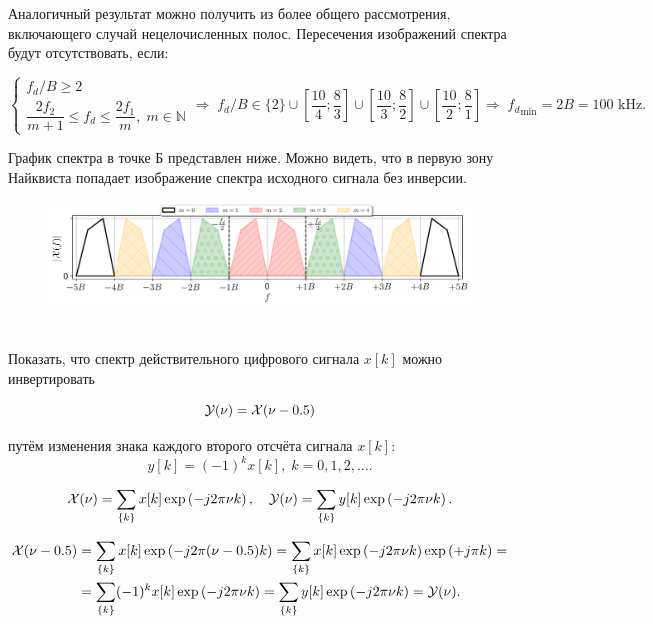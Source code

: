 Аналогичный результат можно получить из более общего рассмотрения, включающего случай нецелочисленных полос. Пересечения изображений спектра будут отсутствовать, если:

\begin{equation*}
\begin{cases}
f_d/B \geq 2\\
\dfrac{2f_2}{m+1} \leq f_d \leq \dfrac{2f_1}{m},\; m \in \mathbb{N}
\end{cases} \Rightarrow \;
f_d/B \in \{2\} 
\cup \left[\dfrac{10}{4}; \dfrac{8}{3}\right] 
\cup \left[\dfrac{10}{3}; \dfrac{8}{2}\right]  
\cup \left[\dfrac{10}{2}; \dfrac{8}{1}\right]  \Rightarrow \;
{f_d}_{\min} = 2B = 100 \text{ kHz.}
\end{equation*}

График спектра в точке Б представлен ниже. Можно видеть, что в первую зону Найквиста попадает изображение спектра исходного сигнала без инверсии.
\begin{figure}[h]
	\centering
	\includegraphics[width=\linewidth]{pics/spring/11/11-2-1.png}
	\label{fig:11-1-2}
\end{figure}

\section{}
Показать, что спектр действительного цифрового сигнала $x[k]$ можно инвертировать

\begin{equation*}
\mathcal{Y}(\nu) = \mathcal{X}(\nu-0.5)
\end{equation*}

путём изменения знака каждого второго отсчёта сигнала $x[k]$:
\begin{equation*}
y[k] = (-1)^k x[k],\; k=0,1,2,\ldots.
\end{equation*}

\begin{equation*}
\mathcal{X}(\nu) = \sum_{\{k\}} x[k]\exp\left(-j 2\pi \nu k\right), \quad \mathcal{Y}(\nu) = \sum_{\{k\}} y[k]\exp\left(-j 2\pi \nu k\right).
\end{equation*}

\begin{align*}
\mathcal{X}(\nu-0.5) &= \sum_{\{k\}} x[k]\exp\left(-j 2\pi (\nu - 0.5) k\right) = \sum_{\{k\}} x[k]\exp\left(-j 2\pi \nu k\right)\exp\left(+j \pi k\right) = \\
&=\sum_{\{k\}}(-1)^k  x[k] \exp\left(-j 2\pi \nu k\right) = \sum_{\{k\}}y[k] \exp\left(-j 2\pi \nu k\right) = \mathcal{Y}(\nu).
\end{align*}

